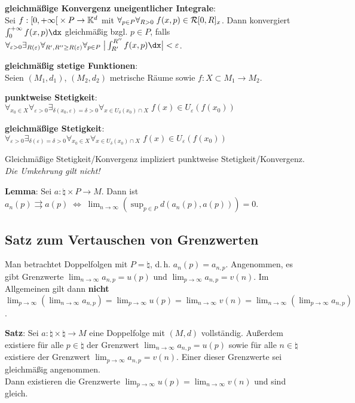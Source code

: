\textbf{gleichmäßige Konvergenz uneigentlicher Integrale}: \\
Sei $f: \left[0, +\infty\right[ \times P \rightarrow \mathbb{K}^d$ mit
$\forall_{p \in P} \forall_{R > 0}\; f(x, p) \in \mathcal{R}[0,R]_x$.
Dann konvergiert $\int_0^{+\infty} f(x, p)\dx$ gleichmäßig bzgl. $p \in P$,
falls $\forall_{\varepsilon > 0} \exists_{R(\varepsilon)}
\forall_{R', R'' \ge R(\varepsilon)} \forall_{p \in P}\;
\big|\int_{R'}^{R''} f(x, p)\dx\big| < \varepsilon$.

\linie

\textbf{gleichmäßig stetige Funktionen}: \\
Seien $(M_1, d_1)$, $(M_2, d_2)$ metrische Räume sowie
$f: X \subset M_1 \rightarrow M_2$.

\textbf{punktweise Stetigkeit}:
$\forall_{x_0 \in X} \forall_{\varepsilon > 0}
\exists_{\delta(x_0, \varepsilon) = \delta > 0}
\forall_{x \in U_\delta(x_0) \cap X}\; f(x) \in U_\varepsilon(f(x_0))$

\textbf{gleichmäßige Stetigkeit}:
$\forall_{\varepsilon > 0}
\exists_{\delta(\varepsilon) = \delta > 0} \forall_{x_0 \in X}
\forall_{x \in U_\delta(x_0) \cap X}\; f(x) \in U_\varepsilon(f(x_0))$

Gleichmäßige Stetigkeit/Konvergenz impliziert punktweise
Stetigkeit/Konvergenz. \\
\emph{Die Umkehrung gilt nicht!}

\linie

\textbf{Lemma}: Sei $a: \natural \times P \rightarrow M$.
Dann ist $a_n(p) \rightrightarrows a(p) \;\Leftrightarrow\;
\lim_{n \to \infty} \left(\sup_{p \in P} d(a_n(p), a(p))\right) = 0$.

\subsection{%
    Satz zum Vertauschen von Grenzwerten%
}

Man betrachtet Doppelfolgen mit $P = \natural$, d.\,h. $a_n(p) = a_{n,p}$.
Angenommen, es gibt Grenzwerte $\lim_{n \to \infty} a_{n,p} = u(p)$
und $\lim_{p \to \infty} a_{n,p} = v(n)$.
Im Allgemeinen gilt dann \textbf{nicht} \\
$\lim_{p \to \infty} (\lim_{n \to \infty} a_{n,p}) =
\lim_{p \to \infty} u(p) = \lim_{n \to \infty} v(n) =
\lim_{n \to \infty} (\lim_{p \to \infty} a_{n,p})$.

\textbf{Satz}:
Sei $a: \natural \times \natural \rightarrow M$ eine Doppelfolge
mit $(M,d)$ vollständig.
Außerdem existiere für alle $p \in \natural$ der Grenzwert
$\lim_{n \to \infty} a_{n,p} = u(p)$ sowie
für alle $n \in \natural$ existiere der Grenzwert
$\lim_{p \to \infty} a_{n,p} = v(n)$.
Einer dieser Grenzwerte sei gleichmäßig angenommen. \\
Dann existieren die Grenzwerte
$\lim_{p \to \infty} u(p) = \lim_{n \to \infty} v(n)$
und sind gleich.

